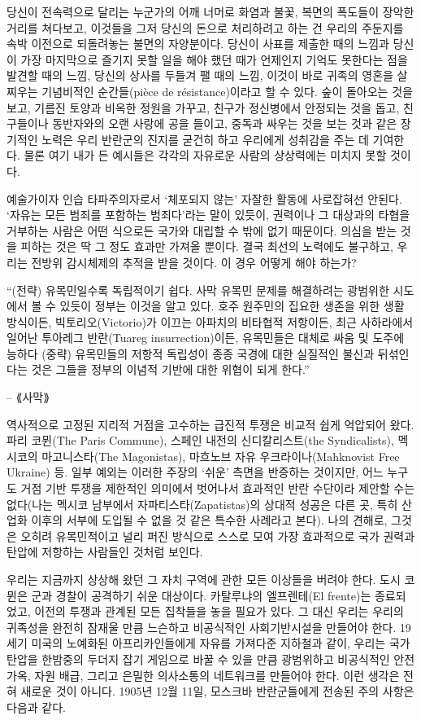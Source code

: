 \documentclass[11pt, b6paper, openany]{memoir}
\begin{document}
\begin{article}
당신이 전속력으로 달리는 누군가의 어깨 너머로 화염과 불꽃, 복면의 폭도들이 장악한 거리를 쳐다보고, 이것들을 그저 당신의 돈으로 처리하려고 하는 건 우리의 주둔지를 속박 이전으로 되돌려놓는 불면의 자양분이다. 당신이 사표를 제출한 때의 느낌과 당신이 가장 마지막으로 즐기지 못할 일을 해야 했던 때가 언제인지 기억도 못한다는 점을 발견할 때의 느낌, 당신의 상사를 두들겨 팰 때의 느낌, 이것이 바로 귀족의 영혼을 살찌우는 기념비적인 순간들(pièce de résistance)이라고 할 수 있다. 숲이 돌아오는 것을 보고, 기름진 토양과 비옥한 정원을 가꾸고, 친구가 정신병에서 안정되는 것을 돕고, 친구들이나 동반자와의 오랜 사랑에 공을 들이고, 중독과 싸우는 것을 보는 것과 같은 장기적인 노력은 우리 반란군의 진지를 굳건히 하고 우리에게 성취감을 주는 데 기여한다. 물론 여기 내가 든 예시들은 각각의 자유로운 사람의 상상력에는 미치지 못할 것이다.

예술가이자 인습 타파주의자로서  ‘체포되지 않는’ 자잘한 활동에 사로잡혀선 안된다. ‘자유는 모든 범죄를 포함하는 범죄다’라는 말이 있듯이, 권력이나 그 대상과의 타협을 거부하는 사람은 어떤 식으로든 국가와 대립할 수 밖에 없기 때문이다. 의심을 받는 것을 피하는 것은 딱 그 정도 효과만 가져올 뿐이다. 결국 최선의 노력에도 불구하고, 우리는 전방위 감시체제의 추적을 받을 것이다. 이 경우 어떻게 해야 하는가? 

    “(전략) 유목민일수록 독립적이기 쉽다. 사막 유목민 문제를 해결하려는 광범위한 시도에서 볼 수 있듯이 정부는 이것을 알고 있다. 호주 원주민의 집요한 생존을 위한 생활 방식이든, 빅토리오(Victorio)가 이끄는 아파치의 비타협적 저항이든, 최근 사하라에서 일어난 투아레그 반란(Tuareg insurrection)이든, 유목민들은 대체로 싸움 및 도주에 능하다 (중략) 유목민들의 저항적 독립성이 종종 국경에 대한 실질적인 불신과 뒤섞인다는 것은 그들을 정부의 이념적 기반에 대한 위협이 되게 한다.”

    -- ⟪사막⟫

역사적으로 고정된 지리적 거점을 고수하는 급진적 투쟁은 비교적 쉽게 억압되어 왔다. 파리 코뮌(The Paris Commune), 스페인 내전의 신디칼리스트(the Syndicalists), 멕시코의 마고니스타(The Magonistas), 마흐노브 자유 우크라이나(Mahknovist Free Ukraine) 등. 일부 예외는 이러한 주장의 ‘쉬운’ 측면을 반증하는 것이지만, 어느 누구도 거점 기반 투쟁을 제한적인 의미에서 벗어나서 효과적인 반란 수단이라 제안할 수는 없다(나는 멕시코 남부에서 자파티스타(Zapatistas)의 상대적 성공은 다른 곳, 특히 산업화 이후의 서부에 도입될 수 없을 것 같은 특수한 사례라고 본다). 나의 견해로, 그것은 오히려 유목민적이고 널리 퍼진 방식으로 스스로 모여 가장 효과적으로 국가 권력과 탄압에 저항하는 사람들인 것처럼 보인다.

우리는 지금까지 상상해 왔던 그 자치 구역에 관한 모든 이상들을 버려야 한다. 도시 코뮌은 군과 경찰이 공격하기 쉬운 대상이다. 카탈루냐의 엘프렌테(El frente)는 종료되었고, 이전의 투쟁과 관계된 모든 집착들을 놓을 필요가 있다. 그 대신 우리는 우리의 귀족성을 완전히 잠재울 만큼 느슨하고 비공식적인 사회기반시설을 만들어야 한다. 19세기 미국의 노예화된 아프리카인들에게 자유를 가져다준 지하철과 같이, 우리는 국가 탄압을 한밤중의 두더지 잡기 게임으로 바꿀 수 있을 만큼 광범위하고 비공식적인 안전가옥, 자원 배급, 그리고 은밀한 의사소통의 네트워크를 만들어야 한다. 이런 생각은 전혀 새로운 것이 아니다. 1905년 12월 11일, 모스크바 반란군들에게 전송된 주의 사항은 다음과 같다. 


\end{article}
\end{document}
